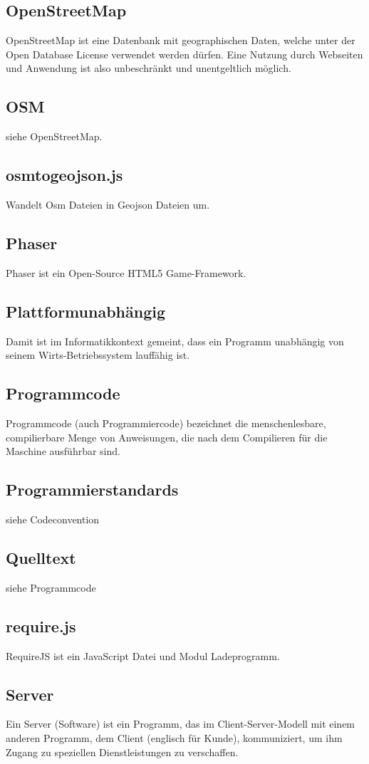 \documentclass[11pt,a4paper]{article}
\begin{document}
\subsection{OpenStreetMap}
OpenStreetMap ist eine  Datenbank mit geographischen Daten, welche unter der Open Database License verwendet werden dürfen. Eine Nutzung durch Webseiten und  Anwendung ist also unbeschränkt und unentgeltlich möglich.
\subsection{OSM}
siehe OpenStreetMap.
\subsection{osmtogeojson.js}
Wandelt Osm Dateien in Geojson Dateien um.
\subsection{Phaser}
Phaser ist ein Open-Source HTML5 Game-Framework.
\subsection{Plattformunabhängig} Damit ist im Informatikkontext gemeint, dass ein Programm unabhängig von seinem Wirts-Betriebssystem lauffähig ist.
\subsection{Programmcode} Programmcode (auch Programmiercode) bezeichnet die menschenlesbare, compilierbare Menge von Anweisungen, die nach dem Compilieren für die Maschine ausführbar sind.
\subsection{Programmierstandards}
siehe Codeconvention
\subsection{Quelltext}
siehe Programmcode
\subsection{require.js}
RequireJS ist ein JavaScript Datei und Modul Ladeprogramm.
\subsection{Server}
Ein Server (Software) ist ein Programm, das im Client-Server-Modell mit einem anderen Programm, dem Client (englisch für Kunde), kommuniziert, um ihm Zugang zu speziellen Dienstleistungen zu verschaffen. \par\bigskip
\end{document}
